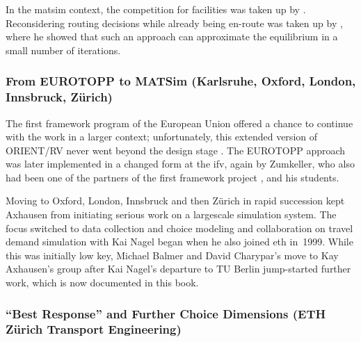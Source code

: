 In the \gls{matsim} context, the competition for facilities was taken up by \citet[][]{HorniEtAl_TRR_2009}.  Reconsidering routing decisions while already being en-route was taken up by \citet[][]{Dobler_PhDThesis_2013}, where he showed that such an approach can approximate the equilibrium in a small number of iterations.

\subsubsection{From EUROTOPP to MATSim (Karlsruhe, Oxford, London, Innsbruck, Zürich)}


The  first framework program of the European Union offered a chance to continue with the work in a larger context; unfortunately, this extended version of ORIENT/RV never went beyond the design stage \citep[][]{AxhausenGoodwin1991}. The EUROTOPP approach was later implemented in a changed form at the \gls{ifv}, again by Zumkeller, who also had been one of the partners of the first framework project \citep[][]{SchnittgerZumkeller_ETC_2004}, and his students.

Moving to Oxford, London, Innsbruck and then Zürich in rapid succession kept Axhausen from initiating serious work on a \gls{largescale} simulation system. 
The focus switched to data collection and choice modeling and 
collaboration on travel demand simulation with Kai Nagel began when he also joined \gls{eth} in~1999. 
While this was initially low key, Michael Balmer and David Charypar's move to Kay Axhausen's group after Kai Nagel's departure to TU Berlin jump-started further work, which is now documented in %
this book.


\subsubsection{``Best Response'' and Further Choice Dimensions (ETH Zürich Transport Engineering)}
\label{sec:zhgroup_matsim}

